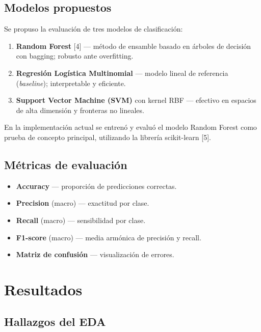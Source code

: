 \documentclass[11pt,twocolumn]{article}
\begin{document}
\subsection{Modelos propuestos}

Se propuso la evaluaci\'on de tres modelos de clasificaci\'on:

\begin{enumerate}[leftmargin=14pt, itemsep=0pt, parsep=2pt]
  \item \textbf{Random Forest} [4] --- m\'etodo de ensamble basado en
        \'arboles de decisi\'on con bagging; robusto ante overfitting.
  \item \textbf{Regresi\'on Log\'istica Multinomial} --- modelo lineal de
        referencia (\textit{baseline}); interpretable y eficiente.
  \item \textbf{Support Vector Machine (SVM)} con kernel RBF --- efectivo
        en espacios de alta dimensi\'on y fronteras no lineales.
\end{enumerate}

En la implementaci\'on actual se entren\'o y evalu\'o el modelo Random
Forest como prueba de concepto principal, utilizando la librer\'ia
scikit-learn [5].

\subsection{M\'etricas de evaluaci\'on}

\begin{itemize}[leftmargin=12pt, itemsep=0pt, parsep=2pt]
  \item \textbf{Accuracy} --- proporci\'on de predicciones correctas.
  \item \textbf{Precision} (macro) --- exactitud por clase.
  \item \textbf{Recall} (macro) --- sensibilidad por clase.
  \item \textbf{F1-score} (macro) --- media arm\'onica de precisi\'on y recall.
  \item \textbf{Matriz de confusi\'on} --- visualizaci\'on de errores.
\end{itemize}

\section{Resultados}

\subsection{Hallazgos del EDA}
\end{document}
